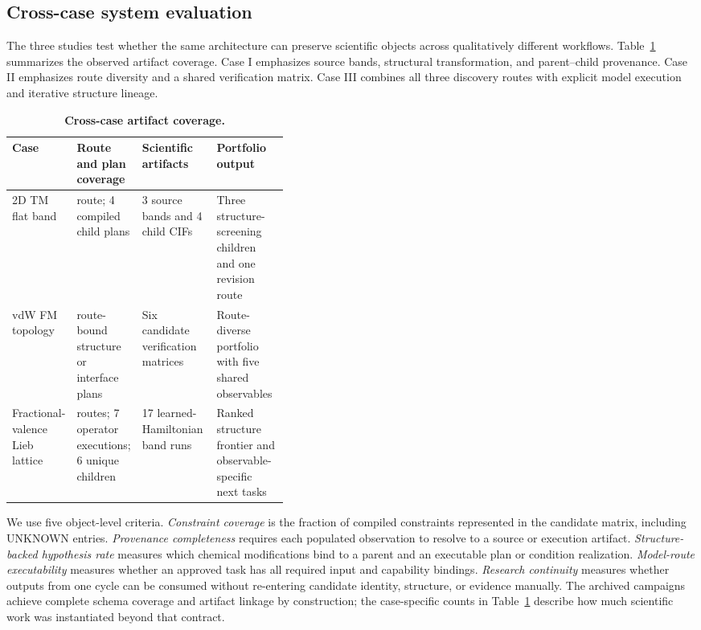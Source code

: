\subsection{Cross-case system evaluation}
\label{sec:evaluation}

The three studies test whether the same architecture can preserve scientific objects across qualitatively different workflows.  Table~\ref{tab:crosscase} summarizes the observed artifact coverage.  Case I emphasizes source bands, structural transformation, and parent--child provenance.  Case II emphasizes route diversity and a shared verification matrix.  Case III combines all three discovery routes with explicit model execution and iterative structure lineage.

\begin{table}[t]
    \centering
    \caption{\textbf{Cross-case artifact coverage.}}
    \label{tab:crosscase}
    \small
    \setlength{\tabcolsep}{3.5pt}
    \renewcommand{\arraystretch}{1.13}
    \begin{tabularx}{\linewidth}{>{\raggedright\arraybackslash}p{0.20\linewidth}>{\raggedright\arraybackslash}p{0.20\linewidth}XX}
        \toprule
        \textbf{Case} & \textbf{Route and plan coverage} & \textbf{Scientific artifacts} & \textbf{Portfolio output} \\
        \midrule
        2D TM flat band & 1 route; 4 compiled child plans & 3 source bands and 4 child CIFs & Three structure-screening children and one revision route \\
        vdW FM topology & 6 route-bound structure or interface plans & Six candidate verification matrices & Route-diverse portfolio with five shared observables \\
        Fractional-valence Lieb lattice & 3 routes; 7 operator executions; 6 unique children & 17 learned-Hamiltonian band runs & Ranked structure frontier and observable-specific next tasks \\
        \bottomrule
    \end{tabularx}
\end{table}

We use five object-level criteria.  \emph{Constraint coverage} is the fraction of compiled constraints represented in the candidate matrix, including UNKNOWN entries.  \emph{Provenance completeness} requires each populated observation to resolve to a source or execution artifact.  \emph{Structure-backed hypothesis rate} measures which chemical modifications bind to a parent and an executable plan or condition realization.  \emph{Model-route executability} measures whether an approved task has all required input and capability bindings.  \emph{Research continuity} measures whether outputs from one cycle can be consumed without re-entering candidate identity, structure, or evidence manually.  The archived campaigns achieve complete schema coverage and artifact linkage by construction; the case-specific counts in Table~\ref{tab:crosscase} describe how much scientific work was instantiated beyond that contract.

